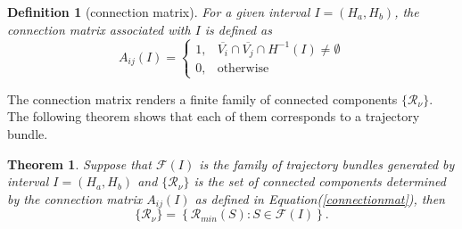 \documentclass{article}
\newtheorem{theorem}{Theorem}
\newtheorem{defi}{Definition}
\numberwithin{equation}{section}
\begin{document}
\begin{defi}[connection matrix]
    For a given interval $I = (H_{a}, H_{b})$, the connection matrix associated with $I$ is defined as 
    \begin{equation}\label{connectionmat}
        A_{ij}(I)=\begin{cases}
1, & \overline{V_{i}}\cap\overline{V_{j}}\cap H^{-1}(I)\neq\emptyset\\
0, & \text{otherwise}
\end{cases}
    \end{equation}
\end{defi}

The connection matrix renders a finite family of connected components $\{\mathcal{R}_{\nu} \}$. The following theorem shows that each of them corresponds to a trajectory bundle.

\begin{theorem}
    Suppose that $\mathcal{F}(I)$ is the family of trajectory bundles generated by interval $I=(H_{a}, H_{b})$ and $\{\mathcal{R}_{\nu} \}$ is the set of connected components determined by the connection matrix $A_{ij}(I)$ as defined in Equation(\ref{connectionmat}), then
    \begin{equation*}
        \{\mathcal{R}_{\nu}\}=\left\{ \mathcal{R}_{min}(S):S\in\mathcal{F}(I)\right\}. 
    \end{equation*}
\end{theorem}
\end{document}
